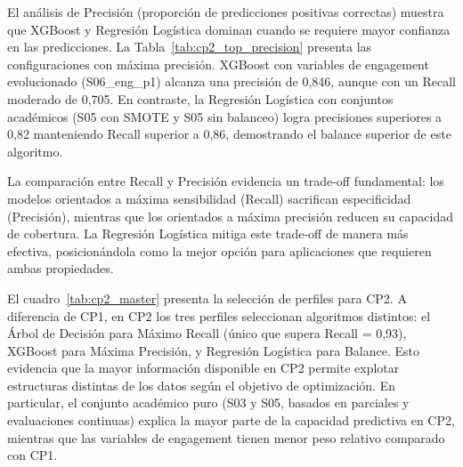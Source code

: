 \documentclass[12pt, letterpaper, openany]{report}
\begin{document}
El análisis de Precisión (proporción de predicciones positivas correctas) muestra que XGBoost y Regresión Logística dominan cuando se requiere mayor confianza en las predicciones. La Tabla~\ref{tab:cp2_top_precision} presenta las configuraciones con máxima precisión. XGBoost con variables de engagement evolucionado (S06\_eng\_p1) alcanza una precisión de 0,846, aunque con un Recall moderado de 0,705. En contraste, la Regresión Logística con conjuntos académicos (S05 con SMOTE y S05 sin balanceo) logra precisiones superiores a 0,82 manteniendo Recall superior a 0,86, demostrando el balance superior de este algoritmo.

La comparación entre Recall y Precisión evidencia un trade-off fundamental: los modelos orientados a máxima sensibilidad (Recall) sacrifican especificidad (Precisión), mientras que los orientados a máxima precisión reducen su capacidad de cobertura. La Regresión Logística mitiga este trade-off de manera más efectiva, posicionándola como la mejor opción para aplicaciones que requieren ambas propiedades.

\begin{table}[!htbp]
  \centering
  \caption{Cinco mejores configuraciones por Precisión en CP2 (confiabilidad de predicciones positivas). XGBoost alcanza máxima precisión absoluta (0,846), pero Reg. Logística mantiene mejor balance recall-precisión.}
  \label{tab:cp2_top_precision}
  \small
\end{table}

\FloatBarrier

El cuadro~\ref{tab:cp2_master} presenta la selección de perfiles para CP2. A diferencia de CP1, en CP2 los tres perfiles seleccionan algoritmos distintos: el Árbol de Decisión para Máximo Recall (único que supera Recall = 0,93), XGBoost para Máxima Precisión, y Regresión Logística para Balance. Esto evidencia que la mayor información disponible en CP2 permite explotar estructuras distintas de los datos según el objetivo de optimización. En particular, el conjunto académico puro (S03 y S05, basados en parciales y evaluaciones continuas) explica la mayor parte de la capacidad predictiva en CP2, mientras que las variables de engagement tienen menor peso relativo comparado con CP1.
\end{document}
